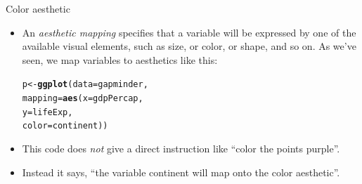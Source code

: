 \documentclass[10pt,handout]{beamer}\usepackage[]{graphicx}\usepackage[]{color}
\makeatletter
\newcommand{\hlstd}[1]{\textcolor[rgb]{0.345,0.345,0.345}{#1}}%
\newcommand{\hlkwb}[1]{\textcolor[rgb]{0.69,0.353,0.396}{#1}}%
\newcommand{\hlkwc}[1]{\textcolor[rgb]{0.333,0.667,0.333}{#1}}%
\newcommand{\hlkwd}[1]{\textcolor[rgb]{0.737,0.353,0.396}{\textbf{#1}}}%
\newenvironment{kframe}{%
 \def\at@end@of@kframe{}%
 \ifinner\ifhmode%
  \def\at@end@of@kframe{\end{minipage}}%
  \begin{minipage}{\columnwidth}%
 \fi\fi%
 \def\FrameCommand##1{\hskip\@totalleftmargin \hskip-\fboxsep
 \colorbox{shadecolor}{##1}\hskip-\fboxsep
     \hskip-\linewidth \hskip-\@totalleftmargin \hskip\columnwidth}%
 \MakeFramed {\advance\hsize-\width
   \@totalleftmargin\z@ \linewidth\hsize
   \@setminipage}}%
 {\par\unskip\endMakeFramed%
 \at@end@of@kframe}
\newenvironment{knitrout}{}{} %
\makeatother
\begin{document}
\begin{frame}[fragile]{Color aesthetic}
\begin{itemize}
	\item An \textit{aesthetic mapping} specifies that a variable will be expressed by one of the available visual elements, such as size, or color, or shape, and so on. As we've seen, we map variables to aesthetics like this: 
\begin{knitrout}
\color{fgcolor}\begin{kframe}
\begin{alltt}
\hlstd{p} \hlkwb{<-}  \hlkwd{ggplot}\hlstd{(}\hlkwc{data} \hlstd{= gapminder,}
                \hlkwc{mapping} \hlstd{=} \hlkwd{aes}\hlstd{(}\hlkwc{x} \hlstd{= gdpPercap,}
                                \hlkwc{y} \hlstd{= lifeExp,}
                                \hlkwc{color} \hlstd{= continent))}
\end{alltt}
\end{kframe}
\end{knitrout}
	\pause
	\item This code does \textit{not} give a direct instruction like ``color the points purple''. \pause
	\item Instead it says, ``the variable continent will map onto the color aesthetic''. 
\end{itemize}
	
\end{frame}
\end{document}
